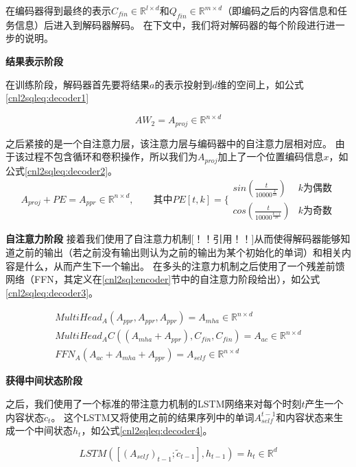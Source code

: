 在编码器得到最终的表示$C_{fin} \in \mathbb{R}^{l \times d}$和$Q_{fin} \in \mathbb{R}^{m \times d}$（即编码之后的内容信息和任务信息）后进入到解码器解码。
在下文中，我们将对解码器的每个阶段进行进一步的说明。

\textbf{结果表示阶段}

在训练阶段，解码器首先要将结果$a$的表示投射到$d$维的空间上，如公式\ref{cnl2sqleq:decoder1}

\begin{equation}
  \label{cnl2sqleq:decoder1}
  AW_2 = A_{proj} \in \mathbb{R}^{n \times d} 
\end{equation}

之后紧接的是一个自注意力层，该注意力层与编码器中的自注意力层相对应。
由于该过程不包含循环和卷积操作，所以我们为$A_{proj}$加上了一个位置编码信息$x$，如公式\ref{cnl2sqleq:decoder2}。
\begin{equation}
  \label{cnl2sqleq:decoder2}
  A_{proj} + PE = A_{ppr} \in \mathbb{R}^{n \times d},\qquad \mbox{其中} PE[t,k] = \{   
  \begin{array}{lr}
    sin(\frac{t}{10000^{\frac{k}{2d}}}) &  k\mbox{为偶数}\\
    cos(\frac{t}{10000^{\frac{k-1}{2d}}}) &  k\mbox{为奇数}
  \end{array}
\end{equation}

\textbf{自注意力阶段}
接着我们使用了自注意力机制[！！引用！！]从而使得解码器能够知道之前的输出（若之前没有输出则认为之前的输出为某个初始化的单词）和相关内容是什么，从而产生下一个输出。
在多头的注意力机制之后使用了一个残差前馈网络（FFN，其定义在\ref{cnl2sql:encoder}节中的自注意力阶段给出），如公式\ref{cnl2sqleq:decoder3}。

\begin{gather}
  \label{cnl2sqleq:decoder3}
  MultiHead_A(A_{ppr},A_{ppr},A_{ppr}) = A_{mha} \in \mathbb{R}^{n \times d}\\
  MultiHead_{A}C((A_{mha} + A_{ppr}),C_{fin},C_{fin}) = A_{ac} \in \mathbb{R}^{n \times d}\\
  FFN_A(A_{ac} + A_{mha} + A_{ppr}) = A_{self} \in \mathbb{R}^{n \times d}
\end{gather}

\textbf{获得中间状态阶段}

之后，我们使用了一个标准的带注意力机制的LSTM网络来对每个时刻$t$产生一个内容状态$\widetilde{c}_t$。
这个LSTM又将使用之前的结果序列中的单词$A^{t-1}_{self}$和内容状态来生成一个中间状态$h_t$，如公式\ref{cnl2sqleq:decoder4}。

\begin{equation}
  \label{cnl2sqleq:decoder4}
  LSTM([(A_{self})_{t-1};\widetilde{c}_{t-1}],h_{t-1})= h_t \in \mathbb{R}^{d} 
\end{equation}

